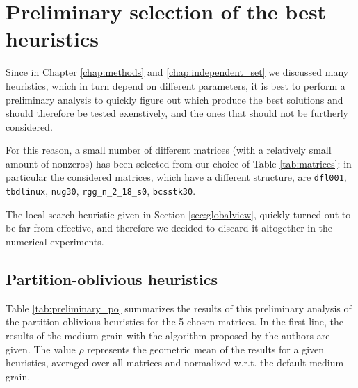 \section{Preliminary selection of the best heuristics}

Since in Chapter \ref{chap:methods} and \ref{chap:independent_set} we discussed many heuristics, which in turn depend on different parameters, it is best to perform a preliminary analysis to quickly figure out which produce the best solutions and should therefore be tested exenstively, and the ones that should not be furtherly considered.

For this reason, a small number of different matrices (with a relatively small amount of nonzeros) has been selected from our choice of Table \ref{tab:matrices}: in particular the considered matrices, which have a different structure, are \verb|dfl001|, \verb|tbdlinux|, \verb|nug30|, \verb|rgg_n_2_18_s0|, \verb|bcsstk30|.

The local search heuristic given in Section \ref{sec:globalview}, quickly turned out to be far from effective, and therefore we decided to discard it altogether in the numerical experiments. 

\subsection{Partition-oblivious heuristics}

Table \ref{tab:preliminary_po} summarizes the results of this preliminary analysis of the partition-oblivious heuristics for the 5 chosen matrices. In the first line, the results of the medium-grain with the algorithm proposed by the authors are given. The value $\rho$ represents the geometric mean of the results for a given heuristics, averaged over all matrices and normalized w.r.t. the default medium-grain.


